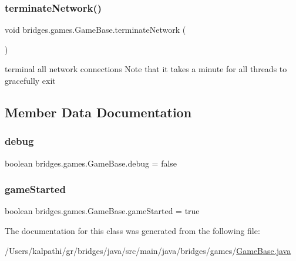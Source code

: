 \subsubsection{\texorpdfstring{terminateNetwork()}{terminateNetwork()}}
{\footnotesize\ttfamily void bridges.\+games.\+Game\+Base.\+terminate\+Network (\begin{DoxyParamCaption}{ }\end{DoxyParamCaption})\hspace{0.3cm}{\ttfamily [protected]}}



terminal all network connections Note that it takes a minute for all threads to gracefully exit 



\subsection{Member Data Documentation}
\mbox{\label{classbridges_1_1games_1_1_game_base_acfe2d7adaeac12868e8f4541a6458c26}} 
\subsubsection{\texorpdfstring{debug}{debug}}
{\footnotesize\ttfamily boolean bridges.\+games.\+Game\+Base.\+debug = false\hspace{0.3cm}{\ttfamily [protected]}}

\mbox{\label{classbridges_1_1games_1_1_game_base_a762327b538bd37afc7ca58e10f15a42c}} 
\subsubsection{\texorpdfstring{gameStarted}{gameStarted}}
{\footnotesize\ttfamily boolean bridges.\+games.\+Game\+Base.\+game\+Started = true\hspace{0.3cm}{\ttfamily [protected]}}



The documentation for this class was generated from the following file\+:\begin{DoxyCompactItemize}
\item 
/\+Users/kalpathi/gr/bridges/java/src/main/java/bridges/games/\mbox{\hyperlink{_game_base_8java}{Game\+Base.\+java}}\end{DoxyCompactItemize}
